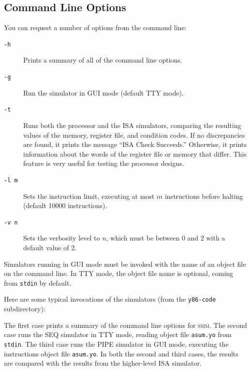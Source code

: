 \documentclass[11pt]{article}
\begin{document}
\subsection{Command Line Options}

You can request a number of options from the command line:
\begin{description}

\item [\texttt{-h}]  
Prints a summary of all of the command line options.

\item[\texttt{-g} ]
Run the simulator in GUI mode (default TTY mode). 

\item[\texttt{-t} ]
Runs both the processor and the ISA simulators, comparing the
resulting values of the memory, register file, and condition codes.
If no discrepancies are found, it prints the message ``ISA Check
Succeeds.''  Otherwise, it prints information about the words of the
register file or memory that differ.  This feature is very useful for
testing the processor designs.

\item[\texttt{-l m} ]
Sets the instruction limit, executing at most $m$ instructions
before halting (default 10000 instructions).

\item[\texttt{-v n} ]
Sets the verbosity level to $n$, which must be between 0 and 2 with a
default value of 2. 


\end{description}
Simulators running in GUI mode must be invoked with the name of an object
file on the command line. In TTY mode, the object file name is
optional, coming from \texttt{stdin} by default. 

Here are some typical invocations of the simulators (from the \texttt{y86-code} 
subdirectory):
\begin{tty}
\end{tty}
The first case prints a summary of the command line options for
\textsc{ssim}.  The second case runs the SEQ simulator in TTY mode,
reading object file \texttt{asum.yo} from \texttt{stdin}.  The third case runs
the PIPE simulator in GUI mode, executing the instructions object file
\texttt{asum.yo}. In both the second and third cases, the results are
compared with the results from the higher-level ISA simulator.
\end{document}
